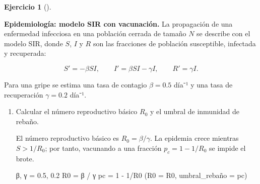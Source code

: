 \documentclass[
  spanish,
  a4paper,
]{scrreport}
\newenvironment{Shaded}{\begin{snugshade}}{\end{snugshade}}
\newcommand{\FloatTok}[1]{\textcolor[rgb]{0.68,0.00,0.00}{#1}}
\newcommand{\NormalTok}[1]{\textcolor[rgb]{0.00,0.23,0.31}{#1}}
\newcommand{\OperatorTok}[1]{\textcolor[rgb]{0.37,0.37,0.37}{#1}}
\theoremstyle{definition}
\newtheorem{exercise}{Ejercicio}[chapter]
\theoremstyle{remark}
\begin{document}
\begin{exercise}[]\protect\hypertarget{exr-sir-vacunacion}{}\label{exr-sir-vacunacion}

\textbf{Epidemiología: modelo SIR con vacunación.} La propagación de una
enfermedad infecciosa en una población cerrada de tamaño \(N\) se
describe con el modelo SIR, donde \(S\), \(I\) y \(R\) son las
fracciones de población susceptible, infectada y recuperada:

\[
S' = -\beta S I, \qquad I' = \beta S I - \gamma I, \qquad R' = \gamma I.
\]

Para una gripe se estima una tasa de contagio \(\beta = 0.5\) día⁻¹ y
una tasa de recuperación \(\gamma = 0.2\) día⁻¹.

\begin{enumerate}
\def\labelenumi{\alph{enumi}.}
\item
  Calcular el número reproductivo básico \(R_0\) y el umbral de
  inmunidad de rebaño.

  \begin{tcolorbox}[enhanced jigsaw, arc=.35mm, bottomrule=.15mm, bottomtitle=1mm, breakable, colback=white, colbacktitle=quarto-callout-note-color!10!white, colframe=quarto-callout-note-color-frame, coltitle=black, left=2mm, leftrule=.75mm, opacityback=0, opacitybacktitle=0.6, rightrule=.15mm, title=\textcolor{quarto-callout-note-color}{\faInfo}\hspace{0.5em}{Ayuda}, titlerule=0mm, toprule=.15mm, toptitle=1mm]

  El número reproductivo básico es \(R_0 = \beta/\gamma\). La epidemia
  crece mientras \(S > 1/R_0\); por tanto, vacunando a una fracción
  \(p_c = 1 - 1/R_0\) se impide el brote.

  \end{tcolorbox}

  \begin{tcolorbox}[enhanced jigsaw, arc=.35mm, bottomrule=.15mm, bottomtitle=1mm, breakable, colback=white, colbacktitle=quarto-callout-tip-color!10!white, colframe=quarto-callout-tip-color-frame, coltitle=black, left=2mm, leftrule=.75mm, opacityback=0, opacitybacktitle=0.6, rightrule=.15mm, title=\textcolor{quarto-callout-tip-color}{\faLightbulb}\hspace{0.5em}{Solución}, titlerule=0mm, toprule=.15mm, toptitle=1mm]

\begin{Shaded}
\begin{Highlighting}[]
\NormalTok{β, γ }\OperatorTok{=} \FloatTok{0.5}\NormalTok{, }\FloatTok{0.2}
\NormalTok{R0 }\OperatorTok{=}\NormalTok{ β }\OperatorTok{/}\NormalTok{ γ}
\NormalTok{pc }\OperatorTok{=} \FloatTok{1} \OperatorTok{{-}} \FloatTok{1}\OperatorTok{/}\NormalTok{R0}
\NormalTok{(R0 }\OperatorTok{=}\NormalTok{ R0, umbral\_rebaño }\OperatorTok{=}\NormalTok{ pc)}
\end{Highlighting}
\end{Shaded}


\end{tcolorbox}
\end{enumerate}
\end{exercise}
\end{document}
